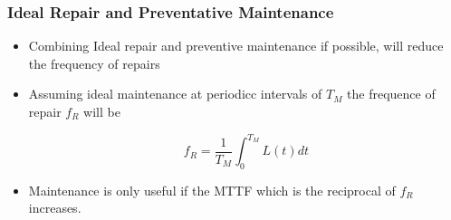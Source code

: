 \documentclass{beamer}  %
\begin{document}
\begin{frame}
\frametitle{Ideal Repair and Preventative Maintenance}

\begin{itemize}
\item Combining Ideal repair and preventive maintenance if possible, will reduce the frequency of repairs

\item Assuming ideal maintenance at periodicc intervals of $T_M$ the frequence of repair $f_R$ will be

$$f_{R}=\frac{1}{T_{M}} \int_{0}^{T_{M}} L(t) d t$$

\item Maintenance is only useful if the MTTF which is the reciprocal of $f_{R}$ increases.

\end{itemize}


\end{frame}
\end{document}
